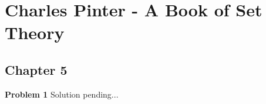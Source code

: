 \documentclass{article}
\begin{document}
\section*{Charles Pinter - A Book of Set Theory}
\subsection*{Chapter 5}

\textbf{Problem 1}
Solution pending...
\end{document}

